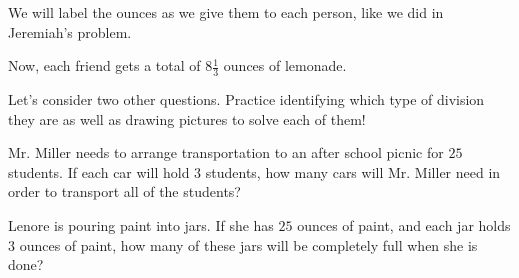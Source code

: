 \documentclass{ximera}
\begin{document}
\begin{question}
\begin{explanation}
We will label the ounces as we give them to each person, like we did in Jeremiah's problem.
\begin{image}  \end{image}
Now, each friend gets a total of $8 \frac{1}{3}$ ounces of lemonade.

\end{explanation}
\end{question}

Let's consider two other questions. Practice identifying which type of division they are as well as drawing pictures to solve each of them!
\begin{question}
Mr. Miller needs to arrange transportation to an after school picnic for $25$ students. If each car will hold $3$ students, how many cars will Mr. Miller need in order to transport all of the students?
\begin{multipleChoice}
\end{multipleChoice}
\end{question}


\begin{question}
Lenore is pouring paint into jars. If she has $25$ ounces of paint, and each jar holds $3$ ounces of paint, how many of these jars will be completely full when she is done?
\begin{multipleChoice}
\end{multipleChoice}
\end{question}
\end{document}
